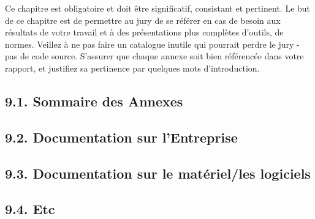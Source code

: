 \documentclass[a4paper, 12pt]{article}
\begin{document}
Ce chapitre est obligatoire et doit être significatif, consistant et pertinent.
Le but de ce chapitre est de permettre au jury de se référer en cas de besoin aux résultats de votre
travail et à des présentations plus complètes d’outils, de normes. Veillez à ne pas faire un catalogue
inutile qui pourrait perdre le jury - pas de code source. S’assurer que chaque annexe soit bien
référencée dans votre rapport, et justifiez sa pertinence par quelques mots d’introduction.

\subsection{9.1. Sommaire des Annexes}

\subsection{9.2. Documentation sur l’Entreprise}

\subsection{9.3. Documentation sur le matériel/les logiciels}

\subsection{9.4. Etc}
\end{document}
